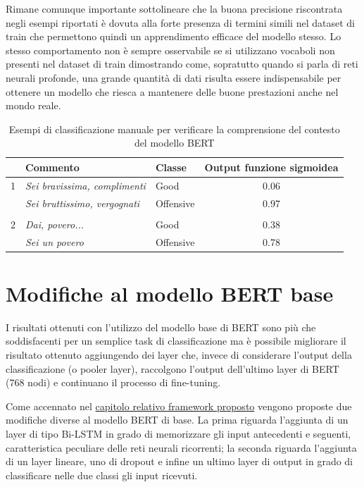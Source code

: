     Rimane comunque importante sottolineare che la buona precisione riscontrata negli esempi riportati è dovuta alla forte presenza di termini simili nel dataset di train che permettono quindi un apprendimento efficace del modello stesso. Lo stesso comportamento non è sempre osservabile se si utilizzano vocaboli non presenti nel dataset di train dimostrando come, sopratutto quando si parla di reti neurali profonde, una grande quantità di dati risulta essere indispensabile per ottenere un modello che riesca a mantenere delle buone prestazioni anche nel mondo reale.
    
    \begin{table}[h]
        \centering
        \begin{tabular}{@{}lllc@{}}
        \toprule
          & \multicolumn{1}{l}{Commento} & Classe    & \multicolumn{1}{l}{Output funzione sigmoidea} \\ \hline %
        1 & \textit{Sei bravissima, complimenti}    & Good      &   0.06    \\
          & \textit{Sei bruttissimo, vergognati}    & Offensive &   0.97    \\
        \\
        2 & \textit{Dai, povero...}                  & Good      &   0.38    \\
          & \textit{Sei un povero}                  & Offensive &   0.78    \\ \bottomrule
        \end{tabular}
        \caption{Esempi di classificazione manuale per verificare la comprensione del contesto del modello BERT}
        \label{Tab:class-example}
    \end{table}
    
    
\section{Modifiche al modello BERT base}
I risultati ottenuti con l'utilizzo del modello base di BERT sono più che soddisfacenti per un semplice task di classificazione ma è possibile migliorare il risultato ottenuto aggiungendo dei layer che, invece di considerare l'output della classificazione (o pooler layer), raccolgono l'output dell'ultimo layer di BERT (768 nodi) e continuano il processo di fine-tuning.

Come accennato nel \hyperref[sec:FrameworkProposto]{capitolo relativo framework proposto} vengono proposte due modifiche diverse al modello BERT di base. La prima riguarda l'aggiunta di un layer di tipo Bi-LSTM in grado di memorizzare gli input antecedenti e seguenti, caratteristica peculiare delle reti neurali ricorrenti; la seconda riguarda l'aggiunta di un layer lineare, uno di dropout e infine un ultimo layer di output in grado di classificare nelle due classi gli input ricevuti. 

